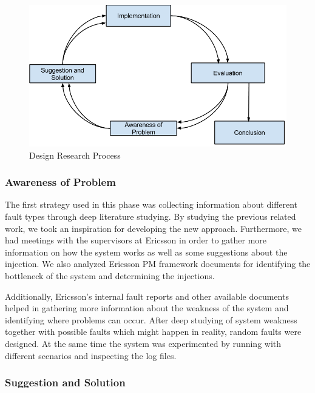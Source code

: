 \begin{figure}
\centering
\includegraphics[width=150mm]{figure/Design_Research_Process.png}
\caption{Design Research Process \label{Design_Research_Process}}
\end{figure}

\subsubsection{Awareness of Problem}

The first strategy used in this phase was collecting information about different fault types through deep literature studying. By studying the previous related work, we took an inspiration for developing the new approach. Furthermore, we had meetings with the supervisors at Ericsson in order to gather more information on how the system works as well as some suggestions about the injection. We also analyzed Ericsson PM framework documents for identifying the bottleneck of the system and determining the injections.

Additionally, Ericsson’s internal fault reports and other available documents helped in gathering more information about the weakness of the system and identifying where problems can occur. After deep studying of system weakness together with possible faults which might happen in reality, random faults were designed. At the same time the system was experimented by running with different scenarios and inspecting the log files.  
 

\subsubsection{Suggestion and Solution}


